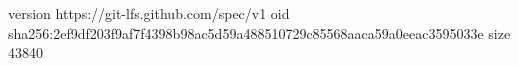 version https://git-lfs.github.com/spec/v1
oid sha256:2ef9df203f9af7f4398b98ac5d59a488510729c85568aaca59a0eeac3595033e
size 43840
